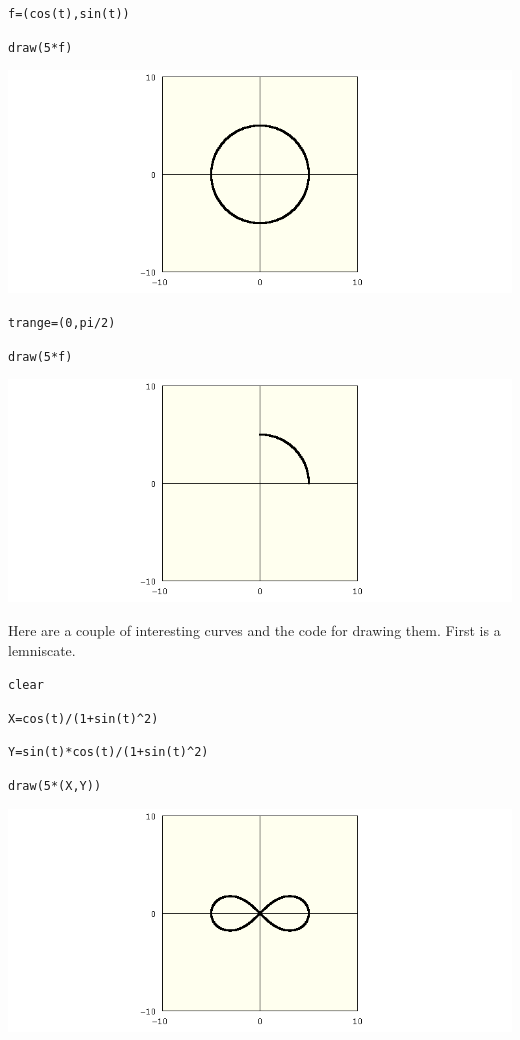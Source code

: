 \medskip
\verb$f=(cos(t),sin(t))$

\verb$draw(5*f)$

\medskip
\begin{center}
\includegraphics[scale=0.4]{circle.png}
\end{center}

\verb$trange=(0,pi/2)$

\verb$draw(5*f)$

\medskip
\begin{center}
\includegraphics[scale=0.4]{circle2.png}
\end{center}

\newpage

\noindent
Here are a couple of interesting curves and the code for drawing them.
First is a lemniscate.

\medskip
\verb$clear$

\verb$X=cos(t)/(1+sin(t)^2)$

\verb$Y=sin(t)*cos(t)/(1+sin(t)^2)$

\verb$draw(5*(X,Y))$

\medskip
\begin{center}
\includegraphics[scale=0.4]{lemniscate.png}
\end{center}

